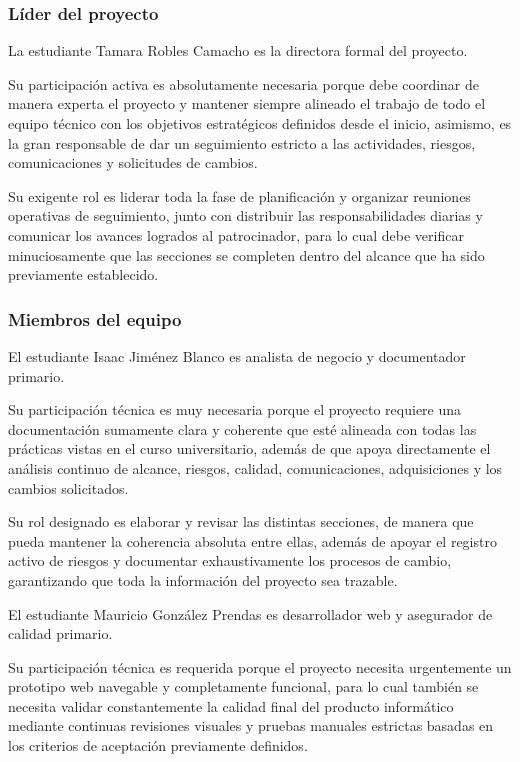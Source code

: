 \documentclass[11pt,spanish]{article}
\begin{document}
\subsubsection{Líder del proyecto}

La estudiante Tamara Robles Camacho es la directora formal del proyecto.

Su participación activa es absolutamente necesaria porque debe coordinar de manera experta el proyecto y mantener siempre alineado el trabajo de todo el equipo técnico con los objetivos estratégicos definidos desde el inicio, asimismo, es la gran responsable de dar un seguimiento estricto a las actividades, riesgos, comunicaciones y solicitudes de cambios.

Su exigente rol es liderar toda la fase de planificación y organizar reuniones operativas de seguimiento, junto con distribuir las responsabilidades diarias y comunicar los avances logrados al patrocinador, para lo cual debe verificar minuciosamente que las secciones se completen dentro del alcance que ha sido previamente establecido.

\subsubsection{Miembros del equipo}

El estudiante Isaac Jiménez Blanco es analista de negocio y documentador primario.

Su participación técnica es muy necesaria porque el proyecto requiere una documentación sumamente clara y coherente que esté alineada con todas las prácticas vistas en el curso universitario, además de que apoya directamente el análisis continuo de alcance, riesgos, calidad, comunicaciones, adquisiciones y los cambios solicitados.

Su rol designado es elaborar y revisar las distintas secciones, de manera que pueda mantener la coherencia absoluta entre ellas, además de apoyar el registro activo de riesgos y documentar exhaustivamente los procesos de cambio, garantizando que toda la información del proyecto sea trazable.

El estudiante Mauricio González Prendas es desarrollador web y asegurador de calidad primario.

Su participación técnica es requerida porque el proyecto necesita urgentemente un prototipo web navegable y completamente funcional, para lo cual también se necesita validar constantemente la calidad final del producto informático mediante continuas revisiones visuales y pruebas manuales estrictas basadas en los criterios de aceptación previamente definidos.
\end{document}
